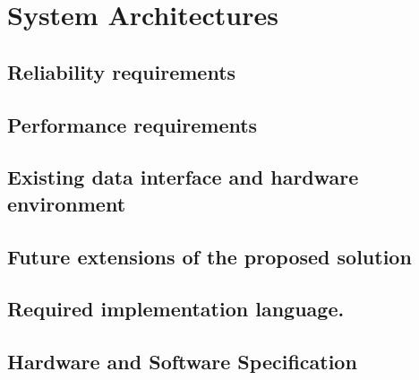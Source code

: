 \section{System Architectures}

\subsection{Reliability requirements}
\subsection{Performance requirements}
\subsection{Existing data interface and hardware environment}
\subsection{Future extensions of the proposed solution}
\subsection{Required implementation language.}
\subsection{Hardware and Software Specification}